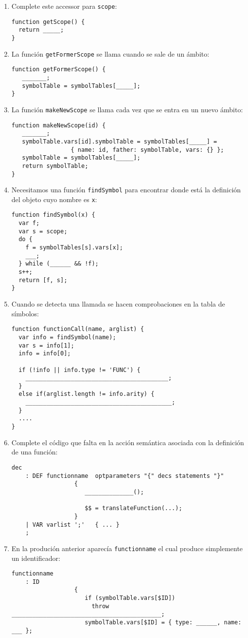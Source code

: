 \begin{enumerate}
\item  Complete este accessor para \verb|scope|:
\begin{verbatim}
function getScope() {
  return _____;
}
\end{verbatim}

\item  La función \verb|getFormerScope| se llama cuando se sale de un ámbito:
\begin{verbatim}
function getFormerScope() {
   _______;
   symbolTable = symbolTables[_____];
}
\end{verbatim}
\item  La función \verb|makeNewScope| se llama cada vez que se entra en un nuevo ámbito:
\begin{verbatim}
function makeNewScope(id) {
   _______;
   symbolTable.vars[id].symbolTable = symbolTables[_____] =  
                 { name: id, father: symbolTable, vars: {} };
   symbolTable = symbolTables[_____];
   return symbolTable;
}
\end{verbatim}
\item 
Necesitamos una función \verb|findSymbol| para encontrar donde está
la definición del objeto cuyo nombre es \verb|x|:
\begin{verbatim}
function findSymbol(x) {
  var f;
  var s = scope;
  do {
    f = symbolTables[s].vars[x];
    ___;
  } while (______ && !f);
  s++;
  return [f, s];
}
\end{verbatim}
\item 
Cuando se detecta una llamada se hacen comprobaciones 
en la tabla de símbolos:
\begin{verbatim}
function functionCall(name, arglist) {
  var info = findSymbol(name);
  var s = info[1];
  info = info[0];

  if (!info || info.type != 'FUNC') {
    _________________________________________;
  }
  else if(arglist.length != info.arity) {
    __________________________________________;
  }
  ....
}
\end{verbatim}

\item  Complete el código que falta en la acción
semántica asociada con la definición de una función:
\begin{verbatim}
dec 
    : DEF functionname  optparameters "{" decs statements "}" 
                  { 
                     ______________();

                     $$ = translateFunction(...);
                  }
    | VAR varlist ';'   { ... }
    ;
\end{verbatim}
\item 
En la produción anterior aparecía \verb|functionname| el cual produce simplemente un identificador:
\begin{verbatim}
functionname
    : ID 
                  {
                     if (symbolTable.vars[$ID]) 
                       throw ___________________________________________;
                     symbolTable.vars[$ID] = { type: ______, name: ___ };


\end{verbatim}
\end{enumerate}
